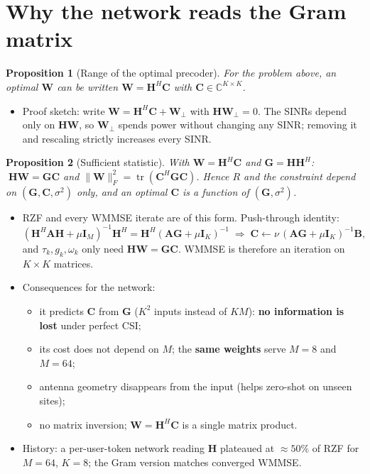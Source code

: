 \documentclass[10pt,a4paper]{article}
\newtheorem{proposition}{Proposition}
\newcommand{\Hm}{\mathbf{H}}
\newcommand{\Gm}{\mathbf{G}}
\newcommand{\Wm}{\mathbf{W}}
\newcommand{\Cm}{\mathbf{C}}
\newcommand{\I}{\mathbf{I}}
\newcommand{\tr}{\operatorname{tr}}
\begin{document}
\section{Why the network reads the Gram matrix}
\begin{proposition}[Range of the optimal precoder]\label{prop:range}
  For the problem above, an optimal $\Wm$ can be written $\Wm = \Hm^H\Cm$ with $\Cm\in\mathbb{C}^{K\times K}$.
\end{proposition}
\begin{itemize}
  \item Proof sketch: write $\Wm = \Hm^H\Cm + \Wm_\perp$ with $\Hm\Wm_\perp = 0$. The SINRs depend only on $\Hm\Wm$, so $\Wm_\perp$
        spends power without changing any SINR; removing it and rescaling strictly increases every SINR.
\end{itemize}
\begin{proposition}[Sufficient statistic]\label{prop:gram}
  With $\Wm = \Hm^H\Cm$ and $\Gm = \Hm\Hm^H$: $\;\Hm\Wm = \Gm\Cm$ and $\|\Wm\|_F^2 = \tr(\Cm^H\Gm\Cm)$.
  Hence $R$ and the constraint depend on $(\Gm,\Cm,\sigma^2)$ only, and an optimal $\Cm$ is a function of $(\Gm, \sigma^2)$.
\end{proposition}
\begin{itemize}
  \item RZF and every WMMSE iterate are of this form. Push-through identity:
  \begin{equation}
    (\Hm^H\mathbf{A}\Hm + \mu\I_M)^{-1}\Hm^H = \Hm^H(\mathbf{A}\Gm + \mu\I_K)^{-1}
    \;\Rightarrow\; \Cm \leftarrow \nu\,(\mathbf{A}\Gm + \mu\I_K)^{-1}\mathbf{B},
  \end{equation}
  and $\tau_k, g_k, \omega_k$ only need $\Hm\Wm = \Gm\Cm$. WMMSE is therefore an iteration on $K\times K$ matrices.
  \item Consequences for the network:
  \begin{itemize}
    \item it predicts $\Cm$ from $\Gm$ ($K^2$ inputs instead of $KM$): \textbf{no information is lost} under perfect CSI;
    \item its cost does not depend on $M$; the \textbf{same weights} serve $M=8$ and $M=64$;
    \item antenna geometry disappears from the input (helps zero-shot on unseen sites);
    \item no matrix inversion; $\Wm = \Hm^H\Cm$ is a single matrix product.
  \end{itemize}
  \item History: a per-user-token network reading $\Hm$ plateaued at $\approx 50\%$ of RZF for $M=64$, $K=8$; the Gram version matches converged WMMSE.
\end{itemize}
\end{document}
